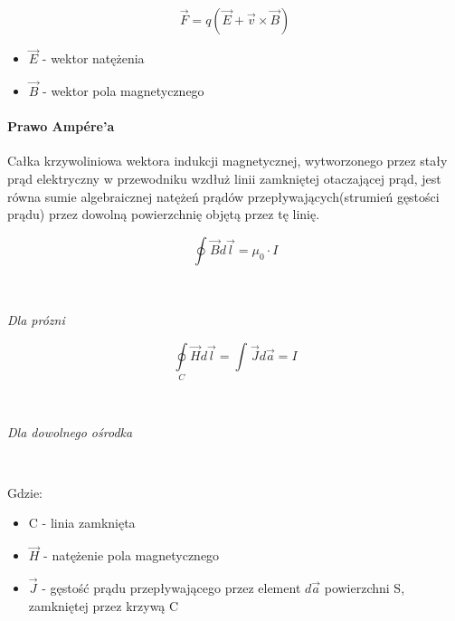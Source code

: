 \documentclass{article}
\begin{document}
            \begin{equation}
                \vec{F} = q(\vec{E} + \vec{v} \times \vec{B})     
            \end{equation}

            \begin{itemize}
                \item $\vec{E}$ - wektor natężenia
                \item $\vec{B}$ - wektor pola magnetycznego
            \end{itemize}

            \paragraph{Prawo Amp\'ere'a}
            Całka krzywoliniowa wektora indukcji magnetycznej, wytworzonego przez stały
            prąd elektryczny w przewodniku wzdłuż linii zamkniętej otaczającej prąd, jest 
            równa sumie algebraicznej natężeń prądów przepływających(strumień gęstości
            prądu) przez dowolną powierzchnię objętą przez tę linię.

            \begin{equation}
                \oint\nolimits_{} \vec{B} d\vec{l} = \mu_0\cdotp I
            \end{equation}
            
            \
            
            \textit{Dla prózni}

            \begin{equation}
                \oint\limits_{C} \vec{H} d\vec{l} = \int\nolimits_{} \vec{J}d\vec{a} = I
            \end{equation}
                        
            \
            
            \textit{Dla dowolnego ośrodka}

            \
            
            Gdzie:
            \begin{itemize}
                \item C - linia zamknięta
                \item $\vec{H}$ - natężenie pola magnetycznego
                \item $\vec{J}$ - gęstość prądu przepływającego przez element
                $d\vec{a}$ powierzchni S, zamkniętej przez krzywą C
            \end{itemize}
\end{document}
